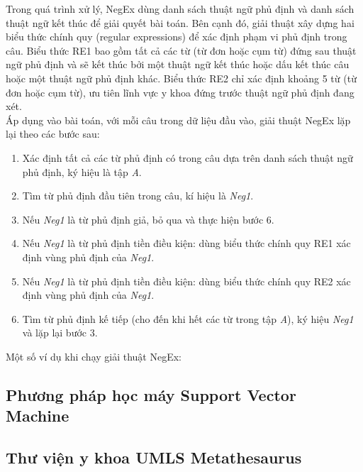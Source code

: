 Trong quá trình xử lý, NegEx dùng danh sách thuật ngữ phủ định và danh sách thuật ngữ kết thúc để giải quyết bài toán. Bên cạnh đó, giải thuật xây dựng hai biểu thức chính quy (regular expressions) để xác định phạm vi phủ định trong câu. Biểu thức RE1 bao gồm tất cả các từ (từ đơn hoặc cụm từ) đứng sau thuật ngữ phủ định và sẽ kết thúc bởi một thuật ngữ kết thúc hoặc dấu kết thúc câu hoặc một thuật ngữ phủ định khác. Biểu thức RE2 chỉ xác định khoảng 5 từ (từ đơn hoặc cụm từ), ưu tiên lĩnh vực y khoa đứng trước thuật ngữ phủ định đang xét. \\

Áp dụng vào bài toán, với mỗi câu trong dữ liệu đầu vào, giải thuật NegEx lặp lại theo các bước sau:

\begin{enumerate}
\item Xác định tất cả các từ phủ định có trong câu dựa trên danh sách thuật ngữ phủ định, ký hiệu là tập \textit{A}.
\item Tìm từ phủ định đầu tiên trong câu, kí hiệu là \textit{Neg1}.
\item Nếu \textit{Neg1} là từ phủ định giả, bỏ qua và thực hiện bước 6.
\item Nếu \textit{Neg1} là từ phủ định tiền điều kiện: dùng biểu thức chính quy RE1 xác định vùng phủ định của \textit{Neg1}.
\item Nếu \textit{Neg1} là từ phủ định tiền điều kiện: dùng biểu thức chính quy RE2 xác định vùng phủ định của \textit{Neg1}.
\item Tìm từ phủ định kế tiếp (cho đến khi hết các từ trong tập \textit{A}), ký hiệu \textit{Neg1} và lặp lại bước 3.
\end{enumerate}

Một số ví dụ khi chạy giải thuật NegEx:



\subsection{Phương pháp học máy Support Vector Machine}
\subsection{Thư viện y khoa UMLS Metathesaurus}
